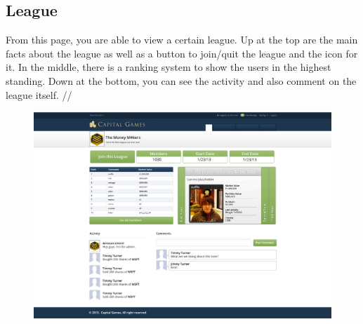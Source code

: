 \subsection{League}
From this page, you are able to view a certain league. Up at the top are the main facts about the league as well as a button to join/quit the league and the icon for it. In the middle, there is a ranking system to show the users in the highest standing. Down at the bottom, you can see the activity and also comment on the league itself. //
\begin{figure}
\centering
\includegraphics[width=5.5in]{./mockups/JPEG/Leagues_third.jpg}
\end{figure}


